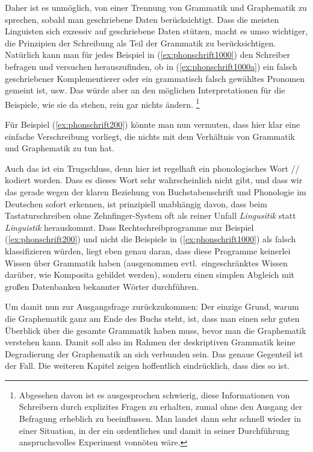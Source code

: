Daher ist es unmöglich, von einer Trennung von Grammatik und Graphematik zu sprechen, sobald man geschriebene Daten berücksichtigt.
Dass die meisten Linguisten sich exzessiv auf geschriebene Daten stützen, macht es umso wichtiger, die Prinzipien der Schreibung als Teil der Grammatik zu berücksichtigen.
Natürlich kann man für jedes Beispiel in (\ref{ex:phonschrift1000}) den Schreiber befragen und versuchen herauszufinden, ob in (\ref{ex:phonschrift1000a}) ein falsch geschriebener Komplementierer oder ein grammatisch falsch gewähltes Pronomen gemeint ist, usw.
Das würde aber an den möglichen Interpretationen für die Beispiele, wie sie da stehen, rein gar nichts ändern.%
\footnote{Abgesehen davon ist es ausgesprochen schwierig, diese Informationen von Schreibern durch explizites Fragen zu erhalten, zumal ohne den Ausgang der Befragung erheblich zu beeinflussen.
Man landet dann sehr schnell wieder in einer Situation, in der ein ordentliches und damit in seiner Durchführung anspruchsvolles Experiment vonnöten wäre.}

Für Beispiel (\ref{ex:phonschrift200}) könnte man nun vermuten, dass hier klar eine einfache Verschreibung vorliegt, die nichts mit dem Verhältnis von Grammatik und Graphematik zu tun hat.

\begin{exe}
\end{exe}

Auch das ist ein Trugschluss, denn hier ist regelhaft ein phonologisches Wort // kodiert worden.
Dass es dieses Wort sehr wahrscheinlich nicht gibt, und dass wir das gerade wegen der klaren Beziehung von Buchstabenschrift und Phonologie im Deutschen sofort erkennen, ist prinzipiell unabhängig davon, dass beim Tastaturschreiben ohne Zehnfinger-System oft als reiner Unfall \textit{Lingusitik} statt \textit{Linguistik} herauskommt.
Dass Rechtschreibprogramme nur Beispiel (\ref{ex:phonschrift200}) und nicht die Beispiele in (\ref{ex:phonschrift1000}) als falsch klassifizieren würden, liegt eben genau daran, dass diese Programme keinerlei Wissen über Grammatik haben (ausgenommen evtl.\ eingeschränktes Wissen darüber, wie Komposita gebildet werden), sondern einen simplen Abgleich mit großen Datenbanken bekannter Wörter durchführen.

Um damit nun zur Ausgangsfrage zurückzukommen:
Der einzige Grund, warum die Graphematik ganz am Ende des Buchs steht, ist, dass man einen sehr guten Überblick über die gesamte Grammatik haben muss, bevor man die Graphematik verstehen kann.
Damit soll also im Rahmen der deskriptiven Grammatik keine Degradierung der Graphematik an sich verbunden sein.
Das genaue Gegenteil ist der Fall.
Die weiteren Kapitel zeigen hoffentlich eindrücklich, dass dies so ist.

